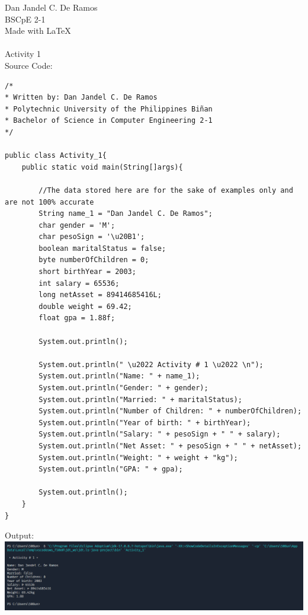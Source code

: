 \documentclass[12pt]{article}
\begin{document}
 
	\noindent
	Dan Jandel C. De Ramos\\
	BSCpE 2-1\\
	Made with \LaTeX \\
	\\
	Activity 1\\
	Source Code:
	
	\begin{verbatim}         
/*
* Written by: Dan Jandel C. De Ramos
* Polytechnic University of the Philippines Biñan
* Bachelor of Science in Computer Engineering 2-1
*/

public class Activity_1{
	public static void main(String[]args){         
		
		//The data stored here are for the sake of examples only and are not 100% accurate        
		String name_1 = "Dan Jandel C. De Ramos";        
		char gender = 'M';
		char pesoSign = '\u20B1';
		boolean maritalStatus = false;
		byte numberOfChildren = 0;
		short birthYear = 2003;
		int salary = 65536;  
		long netAsset = 89414685416L;
		double weight = 69.42;
		float gpa = 1.88f;
		
		System.out.println();
		
		System.out.println(" \u2022 Activity # 1 \u2022 \n");
		System.out.println("Name: " + name_1);
		System.out.println("Gender: " + gender);
		System.out.println("Married: " + maritalStatus);
		System.out.println("Number of Children: " + numberOfChildren);
		System.out.println("Year of birth: " + birthYear);
		System.out.println("Salary: " + pesoSign + " " + salary);
		System.out.println("Net Asset: " + pesoSign + " " + netAsset);
		System.out.println("Weight: " + weight + "kg");
		System.out.println("GPA: " + gpa);       
		
		System.out.println();        
	}
}
	\end{verbatim}
\clearpage
\noindent
Output:\\
\includegraphics[width=\textwidth]{output}
\end{document}
